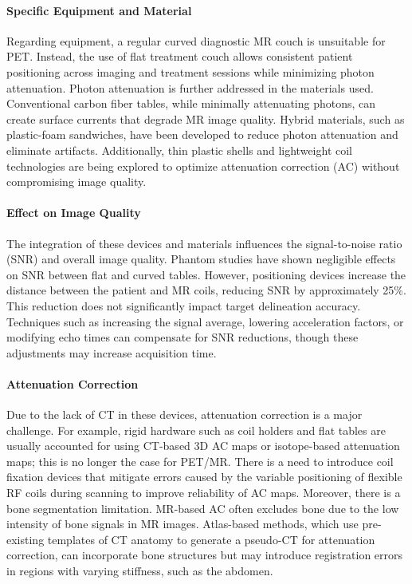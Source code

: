 \documentclass[11pt]{article} %
\begin{document}
\begin{multicols}{2}
\paragraph{Specific Equipment and Material}
Regarding equipment, a regular curved diagnostic MR couch is unsuitable for PET. Instead, the use of flat treatment couch allows consistent patient positioning across imaging and treatment sessions while minimizing photon attenuation. Photon attenuation is further addressed in the materials used. Conventional carbon fiber tables, while minimally attenuating photons, can create surface currents that degrade MR image quality. Hybrid materials, such as plastic-foam sandwiches, have been developed to reduce photon attenuation and eliminate artifacts. Additionally, thin plastic shells and lightweight coil technologies are being explored to optimize attenuation correction (AC) without compromising image quality. %

\paragraph{Effect on Image Quality}
The integration of these devices and materials influences the signal-to-noise ratio (SNR) and overall image quality. Phantom studies have shown negligible effects on SNR between flat and curved tables. However, positioning devices increase the distance between the patient and MR coils, reducing SNR by approximately 25\%. This reduction does not significantly impact target delineation accuracy. Techniques such as increasing the signal average, lowering acceleration factors, %
or modifying echo times can compensate for SNR reductions, though these adjustments may increase acquisition time. %

\paragraph{Attenuation Correction}
Due to the lack of CT in these devices, attenuation correction is a major challenge. For example, rigid hardware such as coil holders and flat tables are usually accounted for using CT-based 3D AC maps or isotope-based attenuation maps; this is no longer the case for PET/MR. There is a need to introduce coil fixation devices that mitigate errors caused by the variable positioning of flexible RF coils during scanning to improve reliability of AC maps. Moreover, there is a bone segmentation limitation. MR-based AC often excludes bone due to the low intensity of bone signals in MR images. Atlas-based methods, which use pre-existing templates of CT anatomy to generate a pseudo-CT for attenuation correction, can incorporate bone structures but may introduce registration errors in regions with varying stiffness, such as the abdomen.


\end{multicols}
\end{document}
